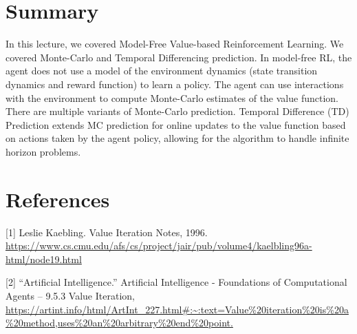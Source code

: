 \documentclass[11pt]{article}
\begin{document}
\section{Summary}
In this lecture, we covered Model-Free Value-based Reinforcement Learning. We covered Monte-Carlo and Temporal Differencing prediction. In model-free RL, the agent does not use a model of the environment dynamics (state transition dynamics and reward function) to learn a policy. The agent can use interactions with the environment to compute Monte-Carlo estimates of the value function. There are multiple variants of Monte-Carlo prediction. Temporal Difference (TD) Prediction extends MC prediction for online updates to the value function based on actions taken by the agent policy, allowing for the algorithm to handle infinite horizon problems.


\section*{References}
[1] Leslie Kaebling. Value Iteration Notes, 1996. \url{https://www.cs.cmu.edu/afs/cs/project/jair/pub/volume4/kaelbling96a-html/node19.html}

[2] “Artificial Intelligence.” Artificial Intelligence - Foundations of Computational Agents -- 9.5.3 Value Iteration, \url{https://artint.info/html/ArtInt_227.html#:~:text=Value\%20iteration\%20is\%20a\%20method,uses\%20an\%20arbitrary\%20end\%20point.}
{


}


\end{document}
